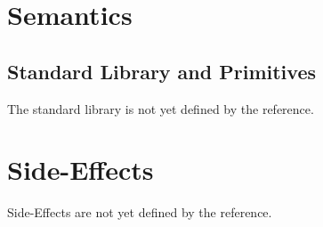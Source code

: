 
\section{Semantics}






\subsection{Standard Library and Primitives}

The standard library is not yet defined by the reference.


\section{Side-Effects}

Side-Effects are not yet defined by the reference.



%

